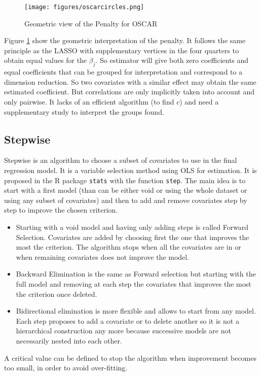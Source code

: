 \documentclass[12pt,a4paper]{report}
\begin{document}
\begin{figure}[h!]
			\centering
			\texttt{[image: figures/oscarcircles.png]} 
			\caption{Geometric view of the Penalty for OSCAR}\label{oscarcircles}
		\end{figure} 
Figure 	\ref{oscarcircles} show the geometric interpretation of the penalty. It follows the same principle as the LASSO with supplementary vertices in the four quarters to obtain equal values for the $\beta_j$. So estimator will give both zero coefficients and equal coefficients that can be grouped for interpretation and correspond to a dimension reduction. So two covariates with a similar effect may obtain the same estimated coefficient. But correlations are only implicitly taken into account and only pairwise. It lacks of an efficient algorithm  (to find $c$) and need a supplementary study to interpret the groups found.
		\subsection{Stepwise}
			
			Stepwise \cite{seber2012linear} is an algorithm to choose a subset of covariates to use in the final regression model. It is a variable selection method using OLS for estimation. It is proposed in the R package {\tt stats} with the function {\tt step}. The main idea is to start with a first model (than can be either void or using the whole dataset or using any subset of covariates) and then to add and remove covariates step by step to improve the chosen criterion. \\
			\begin{itemize}
				\item 	Starting with a void model and having only adding steps is called Forward Selection. Covariates are added by choosing first the one that improves the most the criterion. The algorithm stops when all the covariates are in or when remaining covariates does not improve the model.
				\item Backward Elimination is the same as Forward selection but starting with the full model and removing at each step the covariates that improves the most the criterion once deleted.
				\item Bidirectional elimination is more flexible and allows to start from any model. Each step proposes to add a covariate or to delete another so it is not a hierarchical construction any more because successive models are not necessarily nested into each other.
			\end{itemize}
		A critical value can be defined to stop the algorithm when improvement becomes too small, in order to avoid over-fitting. \\
		
\end{document}
